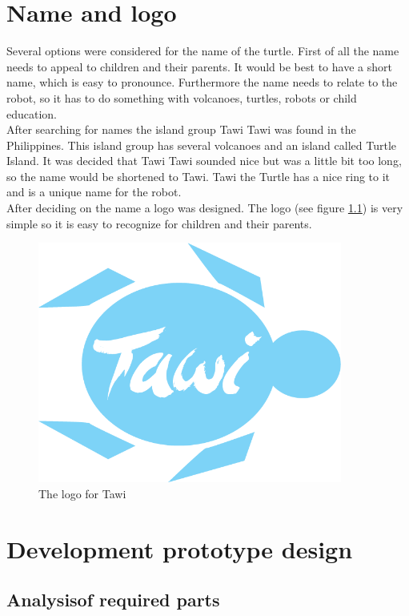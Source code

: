 \documentclass[11pt,twoside,a4paper]{report}
\begin{document}
\chapter{Name and logo}
Several options were considered for the name of the turtle. First of all the name needs to appeal to children and their parents. It would be best to have a short name, which is easy to pronounce. Furthermore the name needs to relate to the robot, so it has to do something with volcanoes, turtles, robots or child education.\\ 
After searching for names the island group Tawi Tawi was found in the Philippines. This island group has several volcanoes and an island called Turtle Island. It was decided that Tawi Tawi sounded nice but was a little bit too long, so the name would be shortened to Tawi. Tawi the Turtle has a nice ring to it and is a unique name for the robot.\\ 
After deciding on the name a logo was designed. The logo (see figure \ref{fig:logo}) is very simple so it is easy to recognize for children and their parents.
\begin{figure}[H]
\begin{center}
\includegraphics[width = 10cm]{Images/logo_Tawi.png}
\caption{The logo for Tawi}
\label{fig:logo}
\end{center}
\end{figure}

\chapter{Development prototype design}
\section{Analysisof required parts}
\end{document}
